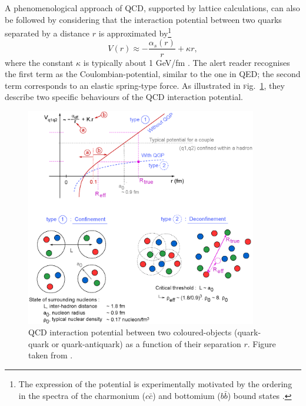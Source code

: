 \documentclass[ALICE,manyauthors]{cernphprep}
\newcommand{\Fig}       {\textsc{f}ig.~}
\newcommand{\fig}       {\Fig}
\begin{document}
A phenomenological approach of QCD, supported by lattice calculations, can also be followed by considering that the interaction potential between two quarks separated by a distance $r$ is approximated by\footnote{The expression of the potential is experimentally motivated by the ordering in the spectra of the charmonium ($c\bar{c}$) and bottomium ($b\bar{b}$) bound states \cite{thomsonModernParticlePhysics2013} \cite{martinParticlePhysics2017}.}
\begin{equation}
V(r) \approx - \frac{\alpha_{s}(r)}{r} + \kappa r,
\label{eq:QCDPotential}
\end{equation}
where the constant $\kappa$ is typically about 1 GeV/fm \cite{martinParticlePhysics2017}. The alert reader recognises the first term as the Coulombian-potential, similar to the one in QED; the second term corresponds to an elastic spring-type force. As illustrated in \fig\ref{fig:QCDPotential}, they describe two specific behaviours of the QCD interaction potential.

\begin{figure}[t]
	\centering
	\includegraphics[width=0.9\textwidth]{Figs/Chapter2/GraphePotentiel.eps}
	\caption{QCD interaction potential between two coloured-objects (quark-quark or quark-antiquark) as a function of their separation $r$. Figure taken from \cite{maireProductionBaryonsMultietranges2011}.}
	\label{fig:QCDPotential}
\end{figure}
\end{document}
